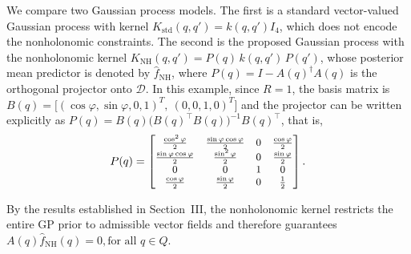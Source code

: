 \documentclass[letterpaper, 10 pt, conference]{ieeeconf}
\newcommand{\D}{\mathcal{D}}
\begin{document}
We compare two Gaussian process models. The first is a standard vector-valued Gaussian process with kernel $K_{\mathrm{std}}(q,q') = k(q,q')I_4$,
which does not encode the nonholonomic constraints. The second is the proposed Gaussian process with the nonholonomic kernel
$K_{\mathrm{NH}}(q,q') = P(q)\,k(q,q')\,P(q')$, whose posterior mean predictor is denoted by $\hat f_{\mathrm{NH}}$, where $P(q)=I-A(q)^\dagger A(q)$ is the orthogonal projector onto $\D$. In this example, since $R=1$, the basis matrix is $\displaystyle{
B(q)=
\big[(\cos\varphi,\sin\varphi,0,1)^T,\ (0,0,1,0)^T\big]}$ and the projector can be written explicitly as $P(q)=B(q)\big(B(q)^\top B(q)\big)^{-1}B(q)^\top$, that is, 
\begin{equation}
\small
P(q)=
\begin{bmatrix}
\frac{\cos^2\varphi}{2} & \frac{\sin\varphi\cos\varphi}{2} & 0 & \frac{\cos\varphi}{2}\\
\frac{\sin\varphi\cos\varphi}{2} & \frac{\sin^2\varphi}{2} & 0 & \frac{\sin\varphi}{2}\\
0 & 0 & 1 & 0\\
\frac{\cos\varphi}{2} & \frac{\sin\varphi}{2} & 0 & \frac{1}{2}
\end{bmatrix}.\normalsize
\end{equation}


By the results established in Section~III, the nonholonomic kernel restricts the entire GP prior to admissible vector fields and therefore guarantees $A(q)\hat f_{\mathrm{NH}}(q)=0, \text{for all } q\in Q$.
\end{document}
